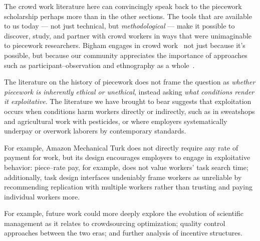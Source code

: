 \documentclass[pn4226]{subfiles}
\begin{document}
The crowd work literature here can convincingly speak back to
the piecework scholarship perhaps more than in the other sections.
The tools that are available to us today
--- not just technical, but \textit{methodological} ---
make it possible to
discover, study, and partner with 
crowd workers in ways that were unimaginable to piecework researchers.
Bigham engages in crowd work~\cite{bighamHalfWorkday}
not just because it's possible, but because our community
appreciates the importance of approaches such as participant--observation and ethnography as a whole~\cite{olson2014ways}.

The literature on the history of piecework does not
frame the question as \textit{whether piecework is inherently ethical or unethical},
instead asking \textit{what conditions render it exploitative}.
The literature we have brought to bear suggests that exploitation occurs when
conditions harm workers directly or indirectly, such as
in sweatshops and agricultural work with pesticides, or where
employers systematically underpay or overwork laborers by contemporary standards.

For example, Amazon Mechanical Turk does not directly require any rate of payment for work,
but its design encourages employers to engage in exploitative behavior:
piece--rate pay, for example, does not value workers' task search time;
additionally, task design interfaces undeniably frame
workers as unreliable by recommending
replication with multiple workers rather than
trusting and paying individual workers more.


For example, future work could more deeply explore the evolution of
scientific management as it relates to
crowdsourcing optimization;
quality control approaches between the two eras; and
further analysis of incentive structures.
\end{document}
